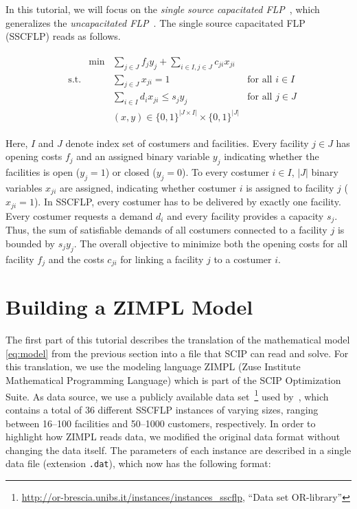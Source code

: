 \documentclass[a4paper,10pt]{article}
\begin{document}
In this tutorial, we will focus on the \emph{single source capacitated FLP}~\cite{daskin1993new},
which generalizes the \emph{uncapacitated FLP}~\cite{daskin1993toward}.
The single source capacitated FLP (SSCFLP) reads as follows.

\begin{align}
%
\begin{aligned}
&           & \min & \sum\limits_{j \in J} f_{j} y_{j} + \sum\limits_{i\in I, j\in J} c_{ji} x_{ji} & \\
&\text{s.t.}&& \sum\limits_{j \in J} x_{ji} = 1 & \text{for all $i \in I$}\\
&           && \sum\limits_{i \in I} d_{i} x_{ji} \leq s_{j} y_{j} & \text{for all $j \in J$}\\
&           && (x,y) \in \{0,1\}^{|J \times I|} \times \{0,1\}^{|J|} &
\end{aligned}
\tag{SSCFLP}\label{eq:model}
\end{align}

Here, $I$ and $J$ denote index set of costumers and facilities.
Every facility $j \in J$ has opening costs $f_j$ and an assigned binary variable $y_j$
indicating whether the facilities is open ($y_j = 1$) or closed ($y_j = 0$).
To every costumer $i \in I$, $\vert J \vert$ binary variables $x_{ji}$ are assigned,
indicating whether costumer $i$ is assigned to facility $j$ ($x_{ji} = 1$).
In SSCFLP, every costumer has to be delivered by exactly one facility.
Every costumer requests a demand $d_i$ and every facility provides a capacity $s_j$.
Thus, the sum of satisfiable demands of all costumers connected to a facility $j$ is bounded by $s_jy_j$.
The overall objective to minimize both the opening costs for all facility $f_j$
and the costs $c_{ji}$ for linking a facility $j$ to a costumer $i$.

\section{Building a ZIMPL Model}

The first part of this tutorial describes the translation of the mathematical model \eqref{eq:model} from the previous section into a file that SCIP can read and solve.
%
For this translation, we use the modeling language ZIMPL (Zuse Institute Mathematical Programming Language) which is part of the SCIP Optimization Suite.
%
As data source, we use a publicly available data set~\footnote{\url{http://or-brescia.unibs.it/instances/instances_sscflp}, ``Data set OR-library''} used by~\cite{Guastaroba14},
which contains a total of 36 different SSCFLP instances of varying sizes, ranging between 16--100 facilities and 50--1000 customers, respectively.
%
In order to highlight how ZIMPL reads data, we modified the original data format without changing the data itself.
%
The parameters of each instance are described in a single data file (extension \texttt{.dat}), which now has the following format:
\end{document}
